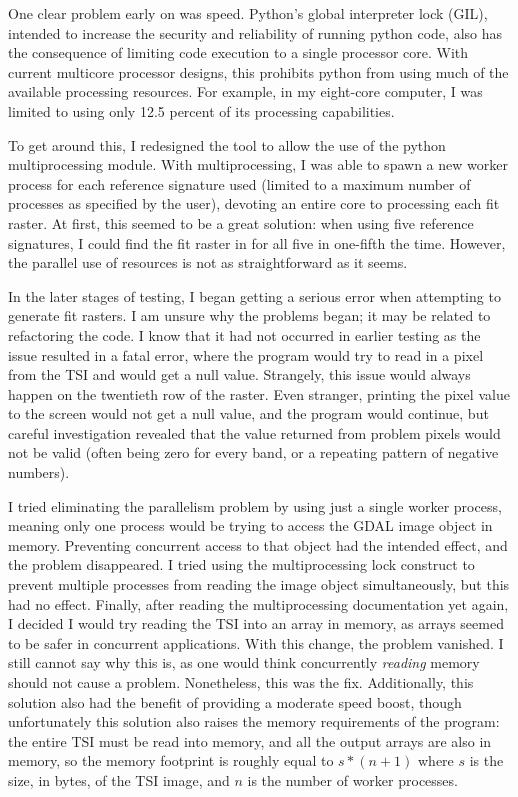 One clear problem early on was speed. Python’s global interpreter lock (GIL), intended to increase the security and reliability of running python code, also has the consequence of limiting code execution to a single processor core. With current multicore processor designs, this prohibits python from using much of the available processing resources. For example, in my eight-core computer, I was limited to using only 12.5 percent of its processing capabilities.

To get around this, I redesigned the tool to allow the use of the python multiprocessing module. With multiprocessing, I was able to spawn a new worker process for each reference signature used (limited to a maximum number of processes as specified by the user), devoting an entire core to processing each fit raster. At first, this seemed to be a great solution: when using five reference signatures, I could find the fit raster in for all five in one-fifth the time. However, the parallel use of resources is not as straightforward as it seems.

In the later stages of testing, I began getting a serious error when attempting to generate fit rasters. I am unsure why the problems began; it may be related to refactoring the code. I know that it had not occurred in earlier testing as the issue resulted in a fatal error, where the program would try to read in a pixel from the TSI and would get a null value. Strangely, this issue would always happen on the twentieth row of the raster. Even stranger, printing the pixel value to the screen would not get a null value, and the program would continue, but careful investigation revealed that the value returned from problem pixels would not be valid (often being zero for every band, or a repeating pattern of negative numbers).

I tried eliminating the parallelism problem by using just a single worker process, meaning only one process would be trying to access the GDAL image object in memory. Preventing concurrent access to that object had the intended effect, and the problem disappeared. I tried using the multiprocessing lock construct to prevent multiple processes from reading the image object simultaneously, but this had no effect. Finally, after reading the multiprocessing documentation yet again, I decided I would try reading the TSI into an array in memory, as arrays seemed to be safer in concurrent applications. With this change, the problem vanished. I still cannot say why this is, as one would think concurrently \textit{reading} memory should not cause a problem. Nonetheless, this was the fix. Additionally, this solution also had the benefit of providing a moderate speed boost, though unfortunately this solution also raises the memory requirements of the program: the entire TSI must be read into memory, and all the output arrays are also in memory, so the memory footprint is roughly equal to $s * (n + 1)$ where $s$ is the size, in bytes, of the TSI image, and $n$ is the number of worker processes.


